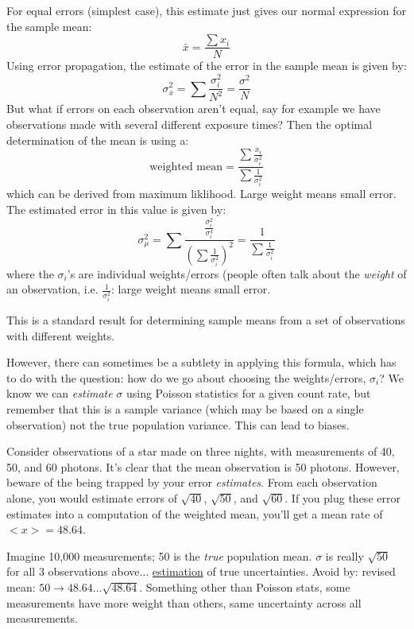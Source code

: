 \documentclass[12pt]{article}
\begin{document}
For equal errors (simplest case),
this estimate just gives our normal expression for
the sample mean:
    $$ \bar{x} = \frac{\sum x_i}{N} $$
Using error propagation, the estimate of the error in the sample mean
is given by:
    $$ \sigma_{\bar{x}}^2 = \sum\frac{\sigma_i^2}{N^2}
       = \frac{\sigma^2}{N}$$
But what if errors on each observation aren't equal, say for example
we have observations made with several different exposure times? Then
the optimal determination of the mean is using a:
    $$ \textrm{weighted\ mean} = \frac{\sum\frac{x_i}{\sigma_i^2}}
       {\sum\frac{1}{\sigma_i^2}} $$
\textcolor{myBlue}{which can be derived from maximum liklihood.
Large weight means small error}.
The estimated error in this value is given by:
    $$ \sigma_{\mu}^2 = \sum\frac{\frac{\sigma_i^2}{\sigma_i^4}}
       {(\sum\frac{1}{\sigma_i^2})^2}
       = \frac{1}{\sum\frac{1}{\sigma_i^2}}$$
where the $\sigma_i$'s are individual weights/errors
(people often talk about the \emph{weight} of an observation, i.e.
$\frac{1}{\sigma_i^2}$: large weight means small error.

This is a standard result for determining sample means from a set of
observations with different weights.

However, there can sometimes be a subtlety in applying this formula,
which has to do with the question: how do we go about choosing the
weights/errors, $\sigma_i$? We know we can \emph{estimate} $\sigma$
using Poisson statistics for a given count rate, but remember that
this is a sample variance (which may be based on a single
observation) not the true population variance. This can lead to
biases.

Consider observations of a star made on three nights, with
measurements of 40, 50, and 60 photons. It's clear that the mean
observation is 50 photons. However, beware of the being trapped by
your error \emph{estimates}. From each observation alone, you would estimate
errors of $\sqrt{40}$, $\sqrt{50}$, and $\sqrt{60}$. If you
plug these error estimates into a computation of the weighted mean,
you'll get a mean rate of $<x>=48.64$.

\textcolor{myBlue}{Imagine 10,000 measurements; 50 is the \emph{true}
population mean. $\sigma$ is really $\sqrt{50}$ for all 3 observations
above$\ldots$ \underline{estimation} of true uncertainties.
Avoid by: revised mean: $50 \rightarrow 48.64 \ldots
\sqrt{48.64}$. Something other than Poisson stats, some measurements
have more weight than others, same uncertainty across all
measurements.}
\end{document}
